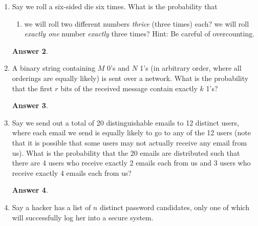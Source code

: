 \documentclass[12pt]{article}
\renewcommand{\(}{\left(}
\renewcommand{\)}{\right)}
\theoremstyle{definition}
\newtheorem*{answer}{Answer}
\begin{document}
\begin{enumerate}
\begin{shaded}
\begin{answer}
    \end{answer}
    \end{shaded}
    \newpage


\item Say we roll a six-sided die six times. What is the probability that
    \begin{enumerate}[label=\alph*.]
    \item we will roll two different numbers \textit{thrice} (three times) each?
    we will roll \textit{exactly one} number \textit{exactly} three times? Hint: Be careful of overcounting.
    \end{enumerate}

    \begin{shaded}
    \begin{answer}

    \end{answer}
    \end{shaded}
    \newpage


\item A binary string containing $M$  0's and $N$  1's (in arbitrary order, where all orderings are equally likely) is sent over a network.  What is the probability that the first $r$ bits of the received message contain exactly $k$  1's?

    \begin{shaded}
    \begin{answer}

    \end{answer}
    \end{shaded}
    \newpage


\item Say we send out a total of 20 distinguishable emails to 12 distinct users, where each email we send is equally likely to go to any of the 12 users (note that it is possible that some users may not actually receive any email from us).  What is the probability that the 20 emails are distributed such that there are 4 users who receive exactly 2 emails each from us and 3 users who receive exactly 4 emails each from us?

    \begin{shaded}
    \begin{answer}

    \end{answer}
    \end{shaded}
    \newpage


\item Say a hacker has a list of $n$ distinct password candidates, only one of which will successfully log her into a secure system.
    \begin{enumerate}[label=\alph*.]


\end{enumerate}
\end{enumerate}
\end{document}
